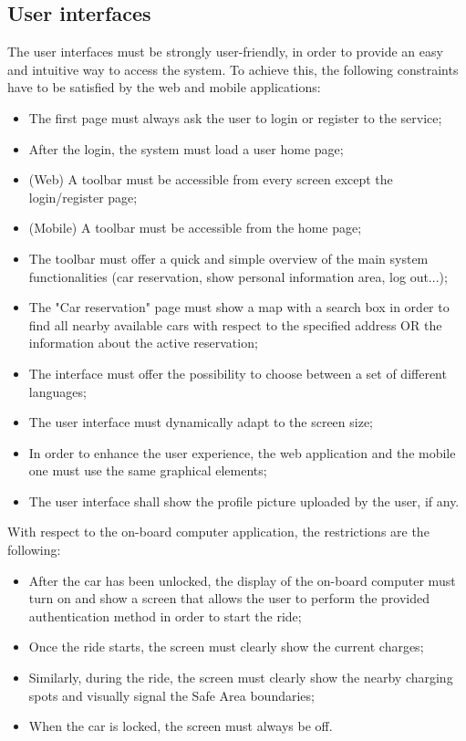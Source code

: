 \subsection{User interfaces} \label{user_int}
The user interfaces must be strongly user-friendly, in order to provide an easy and intuitive way to access the system. To achieve this, the following constraints have to be satisfied by the web and mobile applications:
\begin{itemize}
\item The first page must always ask the user to login or register to the service;
\item After the login, the system must load a user home page;
\item (Web) A toolbar must be accessible from every screen except the login/register page;
\item (Mobile) A toolbar must be accessible from the home page;
\item The toolbar must offer a quick and simple overview of the main system functionalities (car reservation, show personal information area, log out...);
\item The "Car reservation" page must show a map with a search box in order to find all nearby available cars with respect to the specified address OR the information about the active reservation;
\item The interface must offer the possibility to choose between a set of different languages;
\item The user interface must dynamically adapt to the screen size;
\item In order to enhance the user experience, the web application and the mobile one must use the same graphical elements;
\item The user interface shall show the profile picture uploaded by the user, if any.
\end{itemize}
With respect to the on-board computer application, the restrictions are the following:
\begin{itemize}
\item After the car has been unlocked, the display of the on-board computer must turn on and show a screen that allows the user to perform the provided authentication method in order to start the ride;
\item Once the ride starts, the screen must clearly show the current charges;
\item Similarly, during the ride, the screen must clearly show the nearby charging spots and visually signal the Safe Area boundaries;
\item When the car is locked, the screen must always be off.
\end{itemize}
